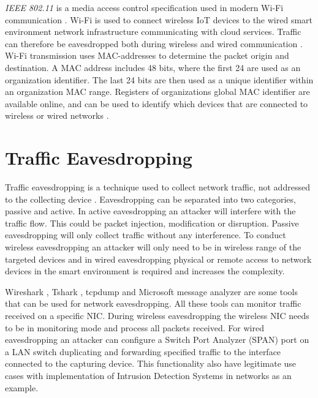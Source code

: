 \textit{IEEE 802.11} is a media access control specification used in modern \gls{Wi-Fi} communication \cite{wifi_ieee80211}. \gls{Wi-Fi} is used to connect wireless \gls{IoT} devices to the wired smart environment network infrastructure communicating with cloud services. Traffic can therefore be eavesdropped both during wireless and wired communication \cite{eavesdroppingwifi}. \gls{Wi-Fi} transmission uses \gls{MAC}-addresses \cite{macaddress} to determine the packet origin and destination. A \gls{MAC} address includes 48 bits, where the first 24 are used as an organization identifier. The last 24 bits are then used as a unique identifier within an organization \gls{MAC} range. Registers of organizations global \gls{MAC} identifier are available online, and can be used to identify which devices that are connected to wireless or wired networks \cite{mac_address_lookup}. 

\section{Traffic Eavesdropping}
Traffic eavesdropping is a technique used to collect network traffic, not addressed to the collecting device \cite{eavsdropping_fortinet}. Eavesdropping can be separated into two categories, passive and active. In active eavesdropping an attacker will interfere with the traffic flow. This could be packet injection, modification or disruption. Passive eavesdropping will only collect traffic without any interference. To conduct wireless eavesdropping an attacker will only need to be in wireless range of the targeted devices \cite{eavesdroppingwifi} and in wired eavesdropping physical or remote access to network devices in the smart environment is required and increases the complexity. 

Wireshark \cite{wireshark}, Tshark \cite{tshark_filter}, tcpdump \cite{tcpdump} and Microsoft message analyzer \cite{microsoftmessageanalyzer} are some tools that can be used for network eavesdropping. All these tools can monitor traffic received on a specific \gls{NIC}. During wireless eavesdropping the wireless \gls{NIC} needs to be in monitoring mode and process all packets received. For wired eavesdropping an attacker can configure a Switch Port Analyzer (SPAN) port on a \gls{LAN} switch duplicating and forwarding specified traffic to the interface connected to the capturing device. This functionality also have legitimate use cases with implementation of Intrusion Detection Systems in networks as an example. 

